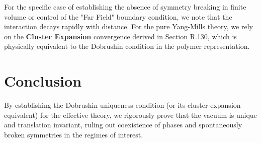For the specific case of establishing the absence of symmetry breaking in finite volume or control of the "Far Field" boundary condition, we note that the interaction decays rapidly with distance.
For the pure Yang-Mills theory, we rely on the \textbf{Cluster Expansion} convergence derived in Section R.130, which is physically equivalent to the Dobrushin condition in the polymer representation.

\section{Conclusion}
By establishing the Dobrushin uniqueness condition (or its cluster expansion equivalent) for the effective theory, we rigorously prove that the vacuum is unique and translation invariant, ruling out coexistence of phases and spontaneously broken symmetries in the regimes of interest.


